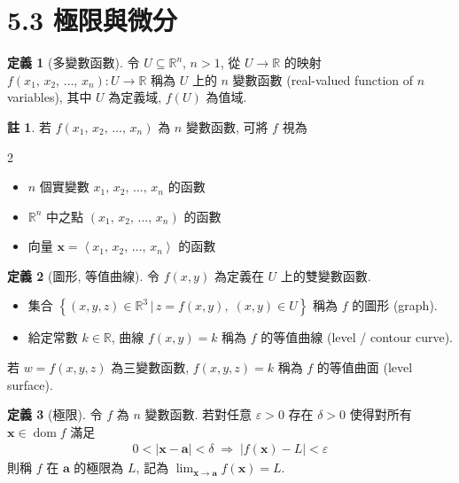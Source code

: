 \documentclass[12pt]{extarticle}
\newcommand{\ds}{\displaystyle}
\newcommand{\ie}{\;\Longrightarrow\;}
\newcommand{\llt}{\left\langle}
\newcommand{\rgt}{\right\rangle}
\DeclareMathOperator*{\dom}{dom}
\theoremstyle{definition}
\newtheorem*{dfn}{定義}
\newtheorem*{rmk}{註}
\newcommand{\va}{\mathbf{a}}
\newcommand{\vx}{\mathbf{x}}
\begin{document}
\section*{5.3 極限與微分}

\begin{dfn}[多變數函數]
  令 $U\subseteq\mathbb{R}^n$, $n > 1$, 從 $U\to\mathbb{R}$ 的映射 $f(x_1,\,x_2,\,\ldots,\,x_n):U\to\mathbb{R}$ 稱為 $U$ 上的 $n$ 變數函數 (real-valued function of $n$ variables), 其中 $U$ 為定義域, $f(U)$ 為值域. 
\end{dfn}

\begin{rmk} 若 $f(x_1,\,x_2,\,\ldots,\,x_n)$ 為 $n$ 變數函數, 可將 $f$ 視為
  \begin{multicols}{2}
    \begin{itemize}\setlength{\itemsep}{0pt}
      \item $n$ 個實變數 $x_1,\,x_2,\,\ldots,\,x_n$ 的函數
      \item $\mathbb{R}^n$ 中之點 $(x_1,\,x_2,\,\ldots,\,x_n)$ 的函數
      \item 向量 $\vx = \llt x_1,\,x_2,\,\ldots,\,x_n\rgt$ 的函數
    \end{itemize}
  \end{multicols}
\end{rmk}

\begin{dfn}[圖形, 等值曲線]
  令 $f(x, y)$ 為定義在 $U$ 上的雙變數函數. 
  \begin{itemize}\setlength{\itemsep}{0pt}
    \item 集合 $\ds\left\{(x, y, z)\in\mathbb{R}^3\,|\,z = f(x, y),\;(x, y)\in U\right\}$ 稱為 $f$ 的圖形 (graph). 
    \item 給定常數 $k\in\mathbb{R}$, 曲線 $f(x, y) = k$ 稱為 $f$ 的等值曲線 (level / contour curve). 
  \end{itemize}
  若 $w = f(x, y, z)$ 為三變數函數, $f(x, y, z) = k$ 稱為 $f$ 的等值曲面 (level surface). 
\end{dfn}

\begin{dfn}[極限] 令 $f$ 為 $n$ 變數函數. 若對任意 $\varepsilon > 0$ 存在 $\delta > 0$ 使得對所有 $\vx\in\dom f$ 滿足 
  \begin{align*}
    0 < |\vx - \va| < \delta \ie |f(\vx) - L| < \varepsilon
  \end{align*}
  則稱 $f$ 在 $\va$ 的極限為 $L$, 記為 $\ds\lim_{\vx\to\va}f(\vx) = L$. 
\end{dfn}
\end{document}
